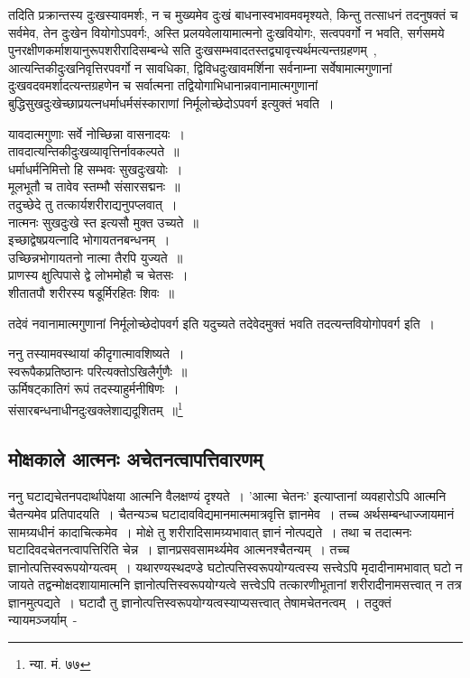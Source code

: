 		{\fontsize{11.7}{0}\selectfont\s तदिति प्रक्रान्तस्य दुःखस्यावमर्शः, न च मुख्यमेव दुःखं बाधनास्वभावमवमृश्यते, किन्तु तत्साधनं तदनुषक्तं च सर्वमेव, तेन दुःखेन वियोगोऽपवर्गः, अस्ति प्रलयवेलायामात्मनो दुःखवियोगः, सत्वपवर्गो न भवति, सर्गसमये पुनरक्षीणकर्माशयानुरूपशरीरादिसम्बन्धे सति दुःखसम्भवादतस्तद्व्यावृत्त्यर्थमत्यन्तग्रहणम्~, आत्यन्तिकीदुःखनिवृत्तिरपवर्गो न सावधिका, द्विविधदुःखावमर्शिना सर्वनाम्ना सर्वेषामात्मगुणानां दुःखवदवमर्शादत्यन्तग्रहणेन च सर्वात्मना तद्वियोगाभिधानान्नवानामात्मगुणानां बुद्धिसुखदुःखेच्छाप्रयत्नधर्माधर्मसंस्काराणां निर्मूलोच्छेदोऽपवर्ग इत्युक्तं भवति~।}

		{\fontsize{11.7}{0}\selectfont\s \begin{center}यावदात्मगुणाः सर्वे नोच्छिन्ना वासनादयः~।\\ तावदात्यन्तिकीदुःखव्यावृत्तिर्नावकल्पते~॥\\ धर्माधर्मनिमित्तो हि सम्भवः सुखदुःखयोः~।\\ मूलभूतौ च तावेव स्तम्भौ संसारसद्मनः~॥\\ तदुच्छेदे तु तत्कार्यशरीराद्यनुपप्लवात्~।\\ नात्मनः सुखदुःखे स्त इत्यसौ मुक्त उच्यते~॥\\ इच्छाद्वेषप्रयत्नादि भोगायतनबन्धनम्~।\\ उच्छिन्नभोगायतनो नात्मा तैरपि युज्यते~॥\\ प्राणस्य क्षुत्पिपासे द्वे लोभमोहौ च चेतसः~।\\ शीतातपौ शरीरस्य षडूर्मिरहितः शिवः~॥\end{center}}

		{\fontsize{11.7}{0}\selectfont\s तदेवं नवानामात्मगुणानां निर्मूलोच्छेदोपवर्ग इति यदुच्यते तदेवेदमुक्तं भवति तदत्यन्तवियोगोपवर्ग इति~।}

		{\fontsize{11.7}{0}\selectfont\s \begin{center}ननु तस्यामवस्थायां कीदृगात्मावशिष्यते~।\\ स्वरूपैकप्रतिष्ठानः परित्यक्तोऽखिलैर्गुणैः~॥\\ ऊर्मिषट्कातिगं रूपं तदस्याहुर्मनीषिणः~।\\ संसारबन्धनाधीनदुःखक्लेशाद्यदूशितम्~॥\footnote{न्या. मं. ७७}\end{center}}

		\subsection{मोक्षकाले आत्मनः अचेतनत्वापत्तिवारणम्}

		ननु घटाद्यचेतनपदार्थापेक्षया आत्मनि वैलक्षण्यं दृश्यते~। 'आत्मा चेतनः' इत्याप्तानां व्यवहारोऽपि आत्मनि चैतन्यमेव प्रतिपादयति~। चैतन्यञ्च घटादावविद्यमानमात्ममात्रवृत्ति ज्ञानमेव~। तच्च अर्थसम्बन्धाज्जायमानं सामग्र्यधीनं कादाचित्कमेव~। मोक्षे तु शरीरादिसामग्र्यभावात् ज्ञानं नोत्पद्यते~। तथा च तदात्मनः घटादिवदचेतनत्वापत्तिरिति चेन्न~। ज्ञानप्रसवसामर्थ्यमेव आत्मनश्चैतन्यम्~। तच्च ज्ञानोत्पत्तिस्वरूपयोग्यत्वम्~। यथारण्यस्थदण्डे घटोत्पत्तिस्वरूपयोग्यत्वस्य सत्त्वेऽपि मृदादीनामभावात् घटो न जायते तद्वन्मोक्षदशायामात्मनि ज्ञानोत्पत्तिस्वरूपयोग्यत्वे सत्त्वेऽपि तत्कारणीभूतानां शरीरादीनामसत्त्वात् न तत्र ज्ञानमुत्पद्यते~। घटादौ तु ज्ञानोत्पत्तिस्वरूपयोग्यत्वस्याप्यसत्त्वात् तेषामचेतनत्वम्~। तदुक्तं न्यायमञ्जर्याम्~-

